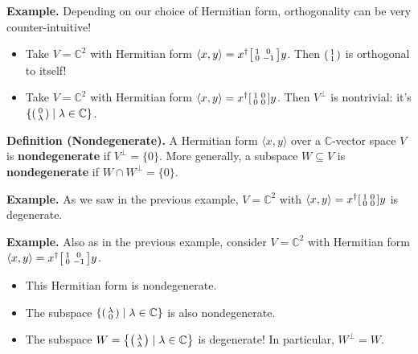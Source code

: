 \textbf{Example.} Depending on our choice of Hermitian form, orthogonality can be very counter-intuitive!
\begin{itemize}
    \item Take $V = \mathbb{C}^2$ with Hermitian form $\langle x, y \rangle = x^{\dagger} \begin{bsmallmatrix} 1 & 0 \\ 0 & -1 \end{bsmallmatrix} y$.  Then $\begin{psmallmatrix} 1 \\ 1 \end{psmallmatrix}$ is orthogonal to itself!
    \item Take $V = \mathbb{C}^2$ with Hermitian form $\langle x, y \rangle = x^{\dagger} \begin{bsmallmatrix} 1 & 0 \\ 0 & 0 \end{bsmallmatrix} y$.  Then $V^{\perp}$ is nontrivial: it's $\left\{ \begin{psmallmatrix} 0 \\ \lambda \end{psmallmatrix} \mid \lambda \in \mathbb{C}\right\}$.
\end{itemize}

\textbf{Definition (Nondegenerate).} A Hermitian form $\langle x, y \rangle$ over a $\mathbb{C}$-vector space $V$ is \textbf{nondegenerate} if $V^{\perp} = \{0\}$.  More generally, a subspace $W \subseteq V$ is \textbf{nondegenerate} if $W \cap W^{\perp} = \{0\}$.

\textbf{Example.} As we saw in the previous example, $V = \mathbb{C}^2$ with $\langle x, y \rangle = x^{\dagger} \begin{bsmallmatrix} 1 & 0 \\ 0 & 0 \end{bsmallmatrix}y$ is degenerate.

\textbf{Example.} Also as in the previous example, consider $V = \mathbb{C}^2$ with Hermitian form $\langle x, y \rangle = x^{\dagger} \begin{bsmallmatrix} 1 & 0 \\ 0 & -1 \end{bsmallmatrix} y$.
\begin{itemize}
    \item This Hermitian form is nondegenerate.
    \item The subspace $\left\{ \begin{psmallmatrix} \lambda \\ 0 \end{psmallmatrix} \mid \lambda \in \mathbb{C}\right\}$ is also nondegenerate.
    \item The subspace $W = \left \{ \begin{psmallmatrix} \lambda \\ \lambda \end{psmallmatrix} \mid \lambda \in \mathbb{C} \right\}$ is degenerate!  In particular, $W^{\perp} = W$.
\end{itemize}

